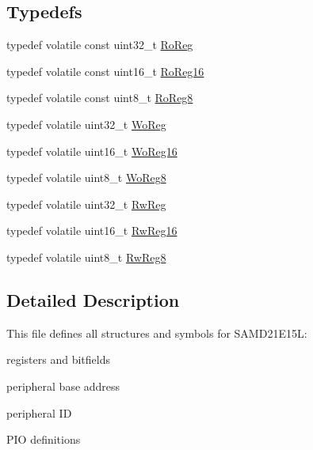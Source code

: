 \subsection*{Typedefs}
\begin{DoxyCompactItemize}
\item 
typedef volatile const uint32\+\_\+t \mbox{\hyperlink{group___s_a_m_d21_e15_l__definitions_ga5d556f8391af4141be23f7334ac9dd68}{Ro\+Reg}}
\item 
typedef volatile const uint16\+\_\+t \mbox{\hyperlink{group___s_a_m_d21_e15_l__definitions_gaebf6e33c2d49a802e06e22a95ea9d0d0}{Ro\+Reg16}}
\item 
typedef volatile const uint8\+\_\+t \mbox{\hyperlink{group___s_a_m_d21_e15_l__definitions_ga0d957f1433aaf5d70e4dc2b68288442d}{Ro\+Reg8}}
\item 
typedef volatile uint32\+\_\+t \mbox{\hyperlink{group___s_a_m_d21_e15_l__definitions_gac0f96d4e8018367b38f527007cf0eafd}{Wo\+Reg}}
\item 
typedef volatile uint16\+\_\+t \mbox{\hyperlink{group___s_a_m_d21_e15_l__definitions_ga0ab0e5f6c8301aa1c2068e511d854094}{Wo\+Reg16}}
\item 
typedef volatile uint8\+\_\+t \mbox{\hyperlink{group___s_a_m_d21_e15_l__definitions_ga5e336e5a36ee12ebeafb021108e5275b}{Wo\+Reg8}}
\item 
typedef volatile uint32\+\_\+t \mbox{\hyperlink{group___s_a_m_d21_e15_l__definitions_gacf1496e3bbe303e55f627fc7558a68c7}{Rw\+Reg}}
\item 
typedef volatile uint16\+\_\+t \mbox{\hyperlink{group___s_a_m_d21_e15_l__definitions_gacce07556c80fc352ae607f225f19fed5}{Rw\+Reg16}}
\item 
typedef volatile uint8\+\_\+t \mbox{\hyperlink{group___s_a_m_d21_e15_l__definitions_gae361754be775bb192f85821d3ab33c17}{Rw\+Reg8}}
\end{DoxyCompactItemize}


\subsection{Detailed Description}
This file defines all structures and symbols for S\+A\+M\+D21\+E15L\+:
\begin{DoxyItemize}
\item registers and bitfields
\item peripheral base address
\item peripheral ID
\item P\+IO definitions 
\end{DoxyItemize}


